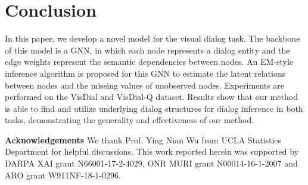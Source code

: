 \documentclass[10pt,twocolumn,letterpaper]{article}
\begin{document}
\vspace{-3pt}
\section{Conclusion}\label{sec:conc}
\vspace{-3pt}
In this paper, we develop a novel model for the visual dialog task. The backbone of this model is a GNN, in which each node represents a dialog entity and the edge weights represent the semantic dependencies between nodes. An EM-style inference algorithm is proposed for this GNN to estimate the latent relations between nodes and the missing values of unobserved nodes. Experiments are performed on the VisDial and VisDial-Q dataset. Results show that our method is able to find and utilize underlying dialog structures for dialog inference in both tasks, demonstrating the generality and effectiveness of our method.

\noindent\textbf{Acknowledgements} We thank Prof. Ying Nian Wu from UCLA Statistics Department for helpful discussions. This work reported herein was supported by DARPA XAI grant N66001-17-2-4029, ONR MURI grant N00014-16-1-2007 and ARO grant W911NF-18-1-0296.

{\small


}
\end{document}
